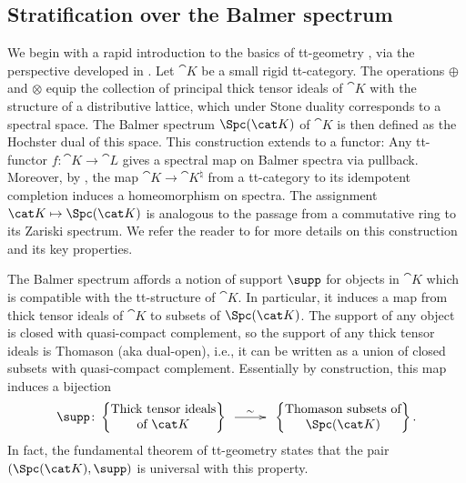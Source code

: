 \documentclass{amsart}%
\numberwithin{equation}{section}%
\theoremstyle{remark}
\begin{document}
\subsection{Stratification over the Balmer spectrum}\label{ssec:stratificationbasics}

We begin with a rapid introduction to the basics of tt-geometry \cite{Balmer05a}, via the perspective developed in \cite{kockpitsch17}. Let $\cat K$ be a small rigid tt-category. The operations $\oplus$ and $\otimes$ equip the collection of principal thick tensor ideals of $\cat K$ with the structure of a distributive lattice, which under Stone duality corresponds to a spectral space. The Balmer spectrum $\Spc(\cat K)$ of $\cat K$ is then defined as the Hochster dual of this space. This construction extends to a functor: Any tt-functor $f\colon \cat K \to \cat L$ gives a spectral map on Balmer spectra via pullback. Moreover, by \cite[Prop.~3.13]{Balmer05a}, the map $\cat K \to \cat K^{\natural}$ from a tt-category to its idempotent completion induces a homeomorphism on spectra. The assignment $\cat K \mapsto \Spc(\cat K)$ is analogous to the passage from a commutative ring to its Zariski spectrum. We refer the reader to \cite{Balmer05a, Balmer10b} for more details on this construction and its key properties. 

The Balmer spectrum affords a notion of support $\supp$ for objects in $\cat K$ which is compatible with the tt-structure of $\cat K$. In particular, it induces a map from thick tensor ideals of $\cat K$ to subsets of $\Spc(\cat K)$. The support of any object is closed with quasi-compact complement, so the support of any thick tensor ideals is Thomason (aka dual-open), i.e., it can be written as a union of closed subsets with quasi-compact complement. Essentially by construction, this map induces a bijection
\begin{equation}\label{eq:balmerclassification}
\supp\colon\begin{Bmatrix}
\text{Thick tensor ideals} \\
\text{of } \cat K
\end{Bmatrix} 
\xymatrix@C=2pc{ \ar[r]^-{\sim} &}
\begin{Bmatrix}
\text{Thomason subsets of}  \\
\Spc(\cat K)
\end{Bmatrix}.
\end{equation}
In fact, the fundamental theorem of tt-geometry \cite[Thm.~3.2 and Thm.~5.2]{Balmer05a} states that the pair $(\Spc(\cat K),\supp)$ is universal with this property. 
\end{document}
